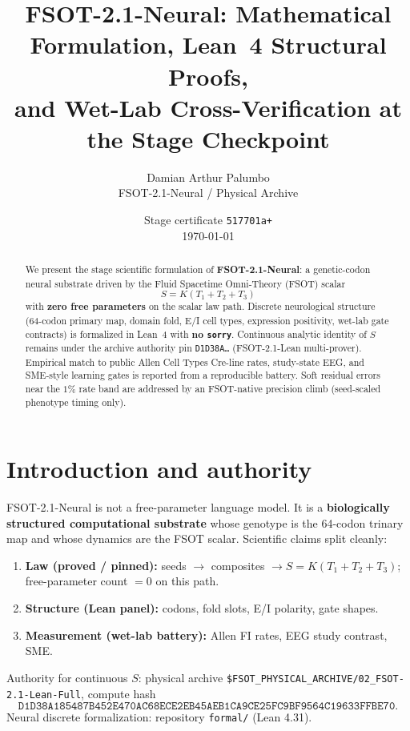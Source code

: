 \documentclass[11pt,a4paper]{article}
\title{FSOT-2.1-Neural: Mathematical Formulation, Lean~4 Structural Proofs,\\
and Wet-Lab Cross-Verification at the Stage Checkpoint}
\author{Damian Arthur Palumbo \\ \small FSOT-2.1-Neural / Physical Archive}
\date{Stage certificate \texttt{517701a+} \\ \today}
\begin{document}
\maketitle

\begin{abstract}
We present the stage scientific formulation of \textbf{FSOT-2.1-Neural}: a
genetic-codon neural substrate driven by the Fluid Spacetime Omni-Theory (FSOT)
scalar
\[
S = K(T_1+T_2+T_3)
\]
with \textbf{zero free parameters} on the scalar law path. Discrete neurological
structure (64-codon primary map, domain fold, E/I cell types, expression positivity,
wet-lab gate contracts) is formalized in Lean~4 with \textbf{no \texttt{sorry}}.
Continuous analytic identity of \(S\) remains under the archive authority pin
\texttt{D1D38A\ldots} (FSOT-2.1-Lean multi-prover). Empirical match to public
Allen Cell Types Cre-line rates, study-state EEG, and SME-style learning gates is
reported from a reproducible battery. Soft residual errors near the \(1\%\) rate
band are addressed by an FSOT-native precision climb (seed-scaled phenotype timing
only).
\end{abstract}

\tableofcontents
\newpage

\section{Introduction and authority}
\label{sec:intro}

FSOT-2.1-Neural is not a free-parameter language model. It is a
\textbf{biologically structured computational substrate} whose genotype is the
64-codon trinary map and whose dynamics are the FSOT scalar. Scientific claims
split cleanly:

\begin{enumerate}[leftmargin=*]
  \item \textbf{Law (proved / pinned):} seeds \(\to\) composites \(\to S=K(T_1+T_2+T_3)\);
        free-parameter count \(=0\) on this path.
  \item \textbf{Structure (Lean panel):} codons, fold slots, E/I polarity, gate shapes.
  \item \textbf{Measurement (wet-lab battery):} Allen FI rates, EEG study contrast, SME.
\end{enumerate}

Authority for continuous \(S\): physical archive
\texttt{\$FSOT\_PHYSICAL\_ARCHIVE/02\_FSOT-2.1-Lean-Full}, compute hash
\[
\texttt{D1D38A185487B452E470AC68ECE2EB45AEB1CA9CE25FC9BF9564C19633FFBE70}.
\]
Neural discrete formalization: repository \texttt{formal/} (Lean 4.31).
\end{document}
